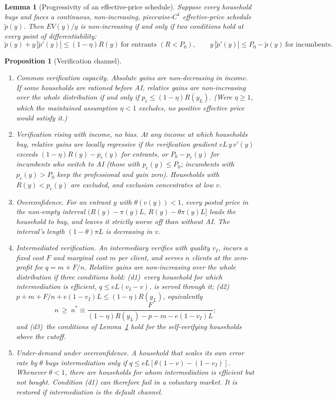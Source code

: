 \documentclass[12pt]{article}
\newtheorem{proposition}{Proposition}
\newtheorem{lemma}{Lemma}
\theoremstyle{remark}
\begin{document}
\begin{lemma}[Progressivity of an effective-price schedule]\label{lem:schedule}
Suppose every household buys and faces a continuous, non-increasing, piecewise-$C^1$ effective-price schedule $\tilde p(y)$. Then $EV(y)/y$ is non-increasing if and only if two conditions hold at every point of differentiability:
\[
\tilde p(y)+y\,|\tilde p'(y)|\le(1-\eta)R(y)\ \text{for entrants }(R<P_0),\qquad y\,|\tilde p'(y)|\le P_0-\tilde p(y)\ \text{for incumbents}.
\]
\end{lemma}

\begin{proposition}[Verification channel]\label{prop:verification}
\begin{enumerate}[label=(\alph*),itemsep=1pt]
\item \emph{Common verification capacity.} Absolute gains are non-decreasing in income. If some households are rationed before AI, relative gains are non-increasing over the whole distribution \emph{if and only if} $p_e\le(1-\eta)R(y_L)$. (Were $\eta\ge1$, which the maintained assumption $\eta<1$ excludes, no positive effective price would satisfy it.)
\item \emph{Verification rising with income, no bias.} At any income at which households buy, relative gains are locally regressive if the verification gradient $eL\,y\,v'(y)$ exceeds $(1-\eta)R(y)-p_e(y)$ for entrants, or $P_0-p_e(y)$ for incumbents who switch to AI (those with $p_e(y)\le P_0$; incumbents with $p_e(y)>P_0$ keep the professional and gain zero). Households with $R(y)<p_e(y)$ are excluded, and exclusion concentrates at low $v$.
\item \emph{Overconfidence.} For an entrant $y$ with $\theta(v(y))<1$, every posted price in the non-empty interval $\big(R(y)-\pi(y)L,\,R(y)-\theta\pi(y)L\big]$ leads the household to buy, and leaves it strictly worse off than without AI. The interval's length $(1-\theta)\pi L$ is decreasing in $v$.
\item \emph{Intermediated verification.} An intermediary verifies with quality $v_I$, incurs a fixed cost $F$ and marginal cost $m$ per client, and serves $n$ clients at the zero-profit fee $q=m+F/n$. Relative gains are non-increasing over the whole distribution if three conditions hold: (d1)~every household for which intermediation is efficient, $q\le eL(v_I-v)$, is served through it; (d2)~$p+m+F/n+e(1-v_I)L\le(1-\eta)R(y_L)$, equivalently
\[
n\ \ge\ n^*\equiv\frac{F}{(1-\eta)R(y_L)-p-m-e(1-v_I)L};
\]
and (d3)~the conditions of Lemma~\ref{lem:schedule} hold for the self-verifying households above the cutoff.
\item \emph{Under-demand under overconfidence.} A household that scales its own error rate by $\theta$ buys intermediation only if $q\le eL[\theta(1-v)-(1-v_I)]$. Whenever $\theta<1$, there are households for whom intermediation is efficient but not bought. Condition (d1) can therefore fail in a voluntary market. It is restored if intermediation is the default channel.
\end{enumerate}
\end{proposition}
\end{document}
